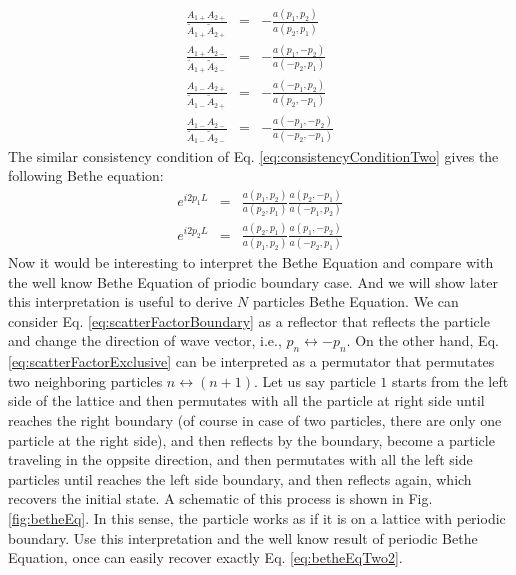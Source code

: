 \documentclass[12pt,a4paper]{article}
\begin{document}
\begin{subequations}
    \label{eq:scatterFactorExclusive2}
    \begin{eqnarray}
        \frac{A_{1+}A_{2+}}{\tilde{A}_{1+}\tilde{A}_{2+}} & = & 
        -\frac{a(p_1, p_2)}{a(p_2, p_1)} \\
        \frac{A_{1+}A_{2-}}{\tilde{A}_{1+}\tilde{A}_{2-}} & = & 
        -\frac{a(p_1, -p_2)}{a(-p_2, p_1)} \\
        \frac{A_{1-}A_{2+}}{\tilde{A}_{1-}\tilde{A}_{2+}} & = & 
        -\frac{a(-p_1, p_2)}{a(p_2, -p_1)} \\
        \frac{A_{1-}A_{2-}}{\tilde{A}_{1-}\tilde{A}_{2-}} & = & 
        -\frac{a(-p_1, -p_2)}{a(-p_2, -p_1)}
    \end{eqnarray}
\end{subequations}
The similar consistency condition of Eq. \eqref{eq:consistencyConditionTwo}
gives the following Bethe equation:
\begin{subequations}
    \label{eq:betheEqTwo2}
    \begin{eqnarray}
        e^{i2p_1L} & = & \frac{a(p_1, p_2)}{a(p_2, p_1)} 
        \frac{a(p_2, -p_1)}{a(-p_1, p_2)}\\
        e^{i2p_2L} & = & \frac{a(p_2, p_1)}{a(p_1, p_2)} 
        \frac{a(p_1, -p_2)}{a(-p_2, p_1)}
    \end{eqnarray}
\end{subequations}
Now it would be interesting to interpret the Bethe Equation and compare with
the well know Bethe Equation of priodic boundary case. And we will show later
this interpretation is useful to derive $N$ particles Bethe Equation. We can
consider Eq.  \eqref{eq:scatterFactorBoundary} as a reflector that reflects the
particle and change the direction of wave vector, i.e., $p_n\leftrightarrow-p_n$.
On the other hand, Eq. \eqref{eq:scatterFactorExclusive} can be interpreted as
a permutator that permutates two neighboring particles $n\leftrightarrow (n+1)$.
Let us say particle $1$ starts from the left side of the lattice and then
permutates with all the particle at right side until reaches the right boundary
(of course in case of two particles, there are only one particle at the right
side), and then reflects by the boundary, become a particle traveling in the
oppsite direction, and then permutates with all the left side particles until
reaches the left side boundary, and then reflects again, which recovers the
initial state. A schematic of this process is shown in Fig.
\ref{fig:betheEq}. In this sense, the particle works as if it is on a
lattice with periodic boundary. Use this interpretation and the well know result
of periodic Bethe Equation, once can easily recover exactly Eq.
\eqref{eq:betheEqTwo2}. 
\end{document}
